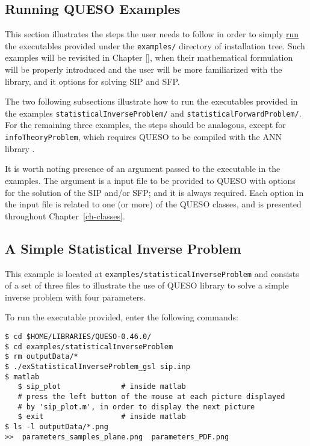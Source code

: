\subsection{Running QUESO Examples} \label{sc-running-execs}

This section illustrates the steps the user needs to follow in order to simply \underline{run} the executables provided under the \verb+examples/+ directory of \Queso{} installation tree. Such examples will be revisited in Chapter \ref{}, when their mathematical formulation will be properly introduced and the user will be more familiarized with the library, and it options for solving SIP and SFP.


%
The two following subsections illustrate how to run the executables provided in the examples \verb+statisticalInverseProblem/+ and
\verb+statisticalForwardProblem/+. For the remaining three examples,
the steps should be analogous, except for \verb+infoTheoryProblem+, which
requires QUESO to be compiled with the ANN library \cite{ANN}. 

It is worth noting presence of an argument passed to the executable in the
examples. The argument is a input file to be provided to QUESO with options for
the solution of the SIP and/or SFP; and it is always required. Each option in
the input file is related to one (or more) of the QUESO classes, and is
presented throughout Chapter~\ref{ch-classes}. 



\subsection{A Simple Statistical Inverse Problem}\label{sec:executable_sip}

This example is located at \verb+examples/statisticalInverseProblem+ and
consists of a set  of three files to illustrate the use of QUESO library to
solve a simple inverse problem with four parameters.

To run the executable provided, enter the following commands:
\begin{lstlisting}[label={},caption={}]
$ cd $HOME/LIBRARIES/QUESO-0.46.0/
$ cd examples/statisticalInverseProblem
$ rm outputData/*
$ ./exStatisticalInverseProblem_gsl sip.inp    
$ matlab
   $ sip_plot	           # inside matlab
   # press the left button of the mouse at each picture displayed 
   # by 'sip_plot.m', in order to display the next picture
   $ exit	               # inside matlab
$ ls -l outputData/*.png
>>  parameters_samples_plane.png  parameters_PDF.png
\end{lstlisting}

